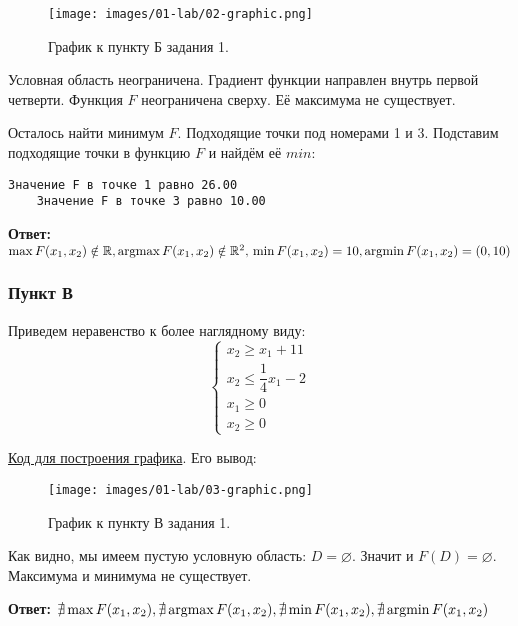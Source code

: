 \begin{figure}[H]
    \texttt{[image: images/01-lab/02-graphic.png]}
    \caption{График к пункту Б задания 1.}
    \label{01-lab-02-graphic}
\end{figure}

Условная область неограничена. Градиент функции направлен внутрь первой четверти. Функция $F$ неограничена сверху. Её максимума не существует.

Осталось найти минимум $F$. Подходящие точки под номерами 1 и 3. Подставим подходящие точки в функцию $F$ и найдём её $min$:

\begin{lstlisting}[language=text]
    Значение F в точке 1 равно 26.00
    Значение F в точке 3 равно 10.00
\end{lstlisting}

\textbf{Ответ:} $\max F(x_1, x_2) \notin \mathbb R, \operatorname*{argmax} F(x_1, x_2) \notin \mathbb R^2,\\
    \min F(x_1, x_2) = 10, \operatorname*{argmin} F(x_1, x_2) = (0, 10)$ \label{01-lab-b-answer}

\subsubsection{Пункт В}\label{01-lab-c}

Приведем неравенство к более наглядному виду:
\[
    \begin{cases}
        x_2 \geq x_1 + 11            \\
        x_2 \leq \dfrac{1}{4}x_1 - 2 \\
        x_1 \geq 0                   \\
        x_2 \geq 0
    \end{cases}
\]

\href{https://github.com/retrobannerS/optimization_methods/blob/main/python/01-lab/C.%2001.py}{Код для построения графика}. Его вывод:

\begin{figure}[H]
    \texttt{[image: images/01-lab/03-graphic.png]}
    \caption{График к пункту В задания 1.}
    \label{01-lab-03-graphic}
\end{figure}

Как видно, мы имеем пустую условную область: $D = \varnothing$. Значит и $F(D) = \varnothing$. Максимума и минимума не существует.

\textbf{Ответ:} $\nexists\max F(x_1, x_2), \nexists\operatorname*{argmax} F(x_1, x_2), \nexists\min F(x_1, x_2), \nexists\operatorname*{argmin} F(x_1, x_2)$ \label{01-lab-c-answer}

\newpage

